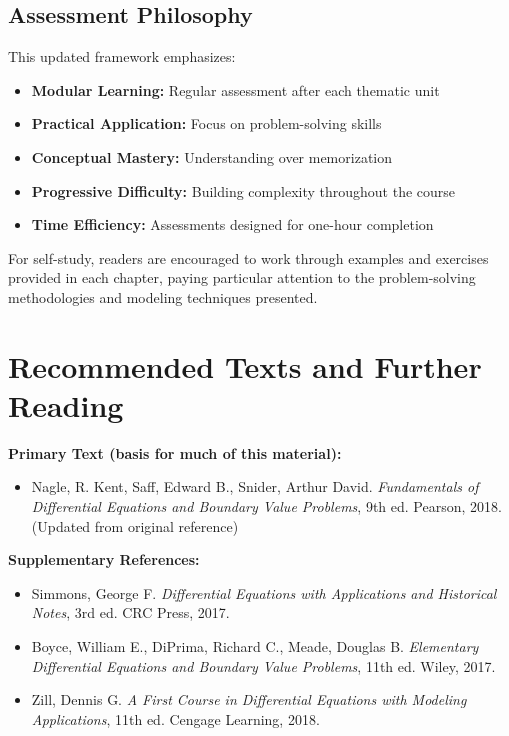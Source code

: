 \documentclass[12pt, letterpaper]{book}
\begin{document}
\section{Assessment Philosophy}
This updated framework emphasizes:
\begin{itemize}
    \item \textbf{Modular Learning:} Regular assessment after each thematic unit
    \item \textbf{Practical Application:} Focus on problem-solving skills
    \item \textbf{Conceptual Mastery:} Understanding over memorization
    \item \textbf{Progressive Difficulty:} Building complexity throughout the course
    \item \textbf{Time Efficiency:} Assessments designed for one-hour completion
\end{itemize}

For self-study, readers are encouraged to work through examples and exercises provided in each chapter, paying particular attention to the problem-solving methodologies and modeling techniques presented.

\chapter{Recommended Texts and Further Reading}
\label{app:texts}
\textbf{Primary Text (basis for much of this material):}
\begin{itemize}
    \item Nagle, R. Kent, Saff, Edward B., Snider, Arthur David. \textit{Fundamentals of Differential Equations and Boundary Value Problems}, 9th ed. Pearson, 2018. (Updated from original reference)
\end{itemize}

\textbf{Supplementary References:}
\begin{itemize}
    \item Simmons, George F. \textit{Differential Equations with Applications and Historical Notes}, 3rd ed. CRC Press, 2017.
    \item Boyce, William E., DiPrima, Richard C., Meade, Douglas B. \textit{Elementary Differential Equations and Boundary Value Problems}, 11th ed. Wiley, 2017.
    \item Zill, Dennis G. \textit{A First Course in Differential Equations with Modeling Applications}, 11th ed. Cengage Learning, 2018.
\end{itemize}
\end{document}
